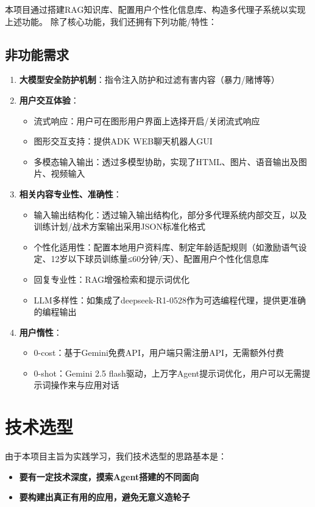 \documentclass{article}
\theoremstyle{plain}
\theoremstyle{definition}
\theoremstyle{remark}
\begin{document}
本项目通过搭建RAG知识库、配置用户个性化信息库、构造多代理子系统以实现上述功能。
除了核心功能，我们还拥有下列功能/特性：

\subsection{非功能需求}
\begin{enumerate}
    \item \textbf{大模型安全防护机制}：指令注入防护和过滤有害内容（暴力/赌博等）
    \item \textbf{用户交互体验}：
    \begin{itemize}
        \item 流式响应：用户可在图形用户界面上选择开启/关闭流式响应
        \item 图形交互支持：提供ADK WEB聊天机器人GUI
        \item 多模态输入输出：透过多模型协助，实现了HTML、图片、语音输出及图片、视频输入
    \end{itemize}
    \item \textbf{相关内容专业性、准确性}：
    \begin{itemize}
        \item 输入输出结构化：透过输入输出结构化，部分多代理系统内部交互，以及训练计划/战术方案输出采用JSON标准化格式
        \item 个性化适用性：配置本地用户资料库、制定年龄适配规则（如激励语气设定、12岁以下球员训练量≤60分钟/天）、配置用户个性化信息库
        \item 回复专业性：RAG增强检索和提示词优化
        \item LLM多样性：如集成了deepseek-R1-0528作为可选编程代理，提供更准确的编程输出
    \end{itemize}
    \item \textbf{用户惰性}：
    \begin{itemize}
        \item 0-cost：基于Gemini免费API，用户端只需注册API，无需额外付费
        \item 0-shot：Gemini 2.5 flash驱动，上万字Agent提示词优化，用户可以无需提示词操作来与应用对话
    \end{itemize}
\end{enumerate}

\section{技术选型}
由于本项目主旨为实践学习，我们技术选型的思路基本是：
\begin{itemize}
    \item \textbf{要有一定技术深度，摸索Agent搭建的不同面向}
    \item \textbf{要构建出真正有用的应用，避免无意义造轮子}
\end{itemize}
\end{document}
